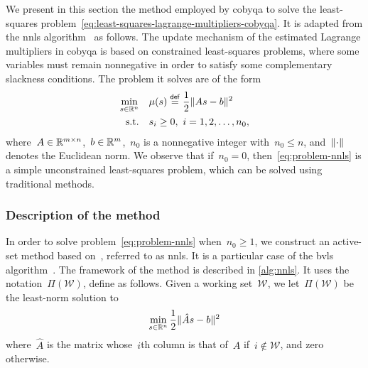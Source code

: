 We present in this section the method employed by \gls{cobyqa} to solve the least-squares problem~\cref{eq:least-squares-lagrange-multipliers-cobyqa}.
It is adapted from the \gls{nnls} algorithm~\cite[Alg.~23.10]{Lawson_Hanson_1987} as follows.
The update mechanism of the estimated Lagrange multipliers in \gls{cobyqa} is based on constrained least-squares problems, where some variables must remain nonnegative in order to satisfy some complementary slackness conditions.
The problem it solves are of the form
\begin{subequations}
    \label{eq:problem-nnls}
    \begin{align}
        \min_{\sstep \in \R^n}  & \quad \mu(\sstep) \eqdef \frac{1}{2} \norm{A \sstep - b}^2\\
        \text{s.t.}             & \quad \sstep_i \ge 0, ~ i = 1, 2, \dots, n_0,
    \end{align}
\end{subequations}
where~$A \in \mathbb{R}^{m \times n}$,~$b \in \mathbb{R}^m$,~$n_0$ is a nonnegative integer with~$n_0 \le n$, and~$\lVert\cdot\rVert$ denotes the Euclidean norm.
We observe that if~$n_0 = 0$, then~\cref{eq:problem-nnls} is a simple unconstrained least-squares problem, which can be solved using traditional methods.

\subsubsection{Description of the method}

In order to solve problem~\cref{eq:problem-nnls} when~$n_0 \ge 1$, we construct an active-set method based on~\cite[Alg.~23.10]{Lawson_Hanson_1987}, referred to as \gls{nnls}.
It is a particular case of the \gls{bvls} algorithm~\cite{Stark_Parker_1995}.
The framework of the method is described in \cref{alg:nnls}.
It uses the notation~$\Pi(\mathcal{W})$, define as follows.
Given a working set~$\mathcal{W}$, we let~$\Pi(\mathcal{W})$ be the least-norm solution to
\begin{equation*}
    \min_{\sstep \in \R^n} \frac{1}{2} \norm{\hat{A} \sstep - b}^2
\end{equation*}
where~$\hat{A}$ is the matrix whose~$i$th column is that of~$A$ if~$i \notin \mathcal{W}$, and zero otherwise.


